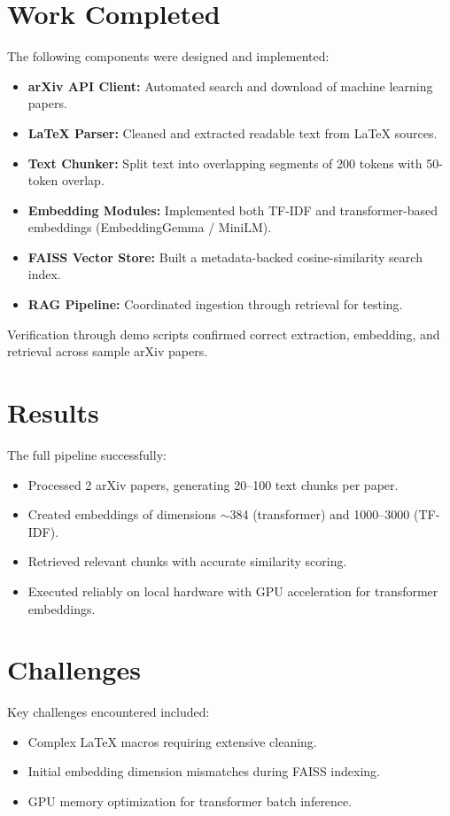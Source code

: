 \documentclass[sigconf]{acmart}
\begin{document}
\section{Work Completed}
The following components were designed and implemented:

\begin{itemize}
  \item \textbf{arXiv API Client:} Automated search and download of machine learning papers.
  \item \textbf{LaTeX Parser:} Cleaned and extracted readable text from LaTeX sources.
  \item \textbf{Text Chunker:} Split text into overlapping segments of 200 tokens with 50-token overlap.
  \item \textbf{Embedding Modules:} Implemented both TF-IDF and transformer-based embeddings (EmbeddingGemma / MiniLM).
  \item \textbf{FAISS Vector Store:} Built a metadata-backed cosine-similarity search index.
  \item \textbf{RAG Pipeline:} Coordinated ingestion through retrieval for testing.
\end{itemize}

Verification through demo scripts confirmed correct extraction, embedding, and retrieval across sample arXiv papers.

\section{Results}
The full pipeline successfully:
\begin{itemize}
  \item Processed 2 arXiv papers, generating 20--100 text chunks per paper.
  \item Created embeddings of dimensions $\sim$384 (transformer) and 1000--3000 (TF-IDF).
  \item Retrieved relevant chunks with accurate similarity scoring.
  \item Executed reliably on local hardware with GPU acceleration for transformer embeddings.
\end{itemize}

\section{Challenges}
Key challenges encountered included:
\begin{itemize}
  \item Complex LaTeX macros requiring extensive cleaning.
  \item Initial embedding dimension mismatches during FAISS indexing.
  \item GPU memory optimization for transformer batch inference.
\end{itemize}
\end{document}
